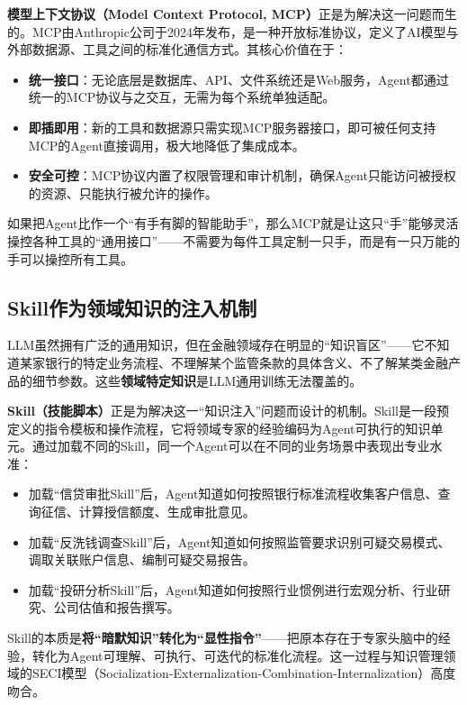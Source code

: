 \textbf{模型上下文协议（Model Context Protocol, MCP）}正是为解决这一问题而生的。MCP由Anthropic公司于2024年发布，是一种开放标准协议，定义了AI模型与外部数据源、工具之间的标准化通信方式。其核心价值在于：

\begin{itemize}[leftmargin=2em]
  \item \textbf{统一接口}：无论底层是数据库、API、文件系统还是Web服务，Agent都通过统一的MCP协议与之交互，无需为每个系统单独适配。
  \item \textbf{即插即用}：新的工具和数据源只需实现MCP服务器接口，即可被任何支持MCP的Agent直接调用，极大地降低了集成成本。
  \item \textbf{安全可控}：MCP协议内置了权限管理和审计机制，确保Agent只能访问被授权的资源、只能执行被允许的操作。
\end{itemize}

如果把Agent比作一个``有手有脚的智能助手''，那么MCP就是让这只``手''能够灵活操控各种工具的``通用接口''——不需要为每件工具定制一只手，而是有一只万能的手可以操控所有工具。

\subsection{Skill作为领域知识的注入机制}

LLM虽然拥有广泛的通用知识，但在金融领域存在明显的``知识盲区''——它不知道某家银行的特定业务流程、不理解某个监管条款的具体含义、不了解某类金融产品的细节参数。这些\textbf{领域特定知识}是LLM通用训练无法覆盖的。

\textbf{Skill（技能脚本）}正是为解决这一``知识注入''问题而设计的机制。Skill是一段预定义的指令模板和操作流程，它将领域专家的经验编码为Agent可执行的知识单元。通过加载不同的Skill，同一个Agent可以在不同的业务场景中表现出专业水准：

\begin{itemize}[leftmargin=2em]
  \item 加载``信贷审批Skill''后，Agent知道如何按照银行标准流程收集客户信息、查询征信、计算授信额度、生成审批意见。
  \item 加载``反洗钱调查Skill''后，Agent知道如何按照监管要求识别可疑交易模式、调取关联账户信息、编制可疑交易报告。
  \item 加载``投研分析Skill''后，Agent知道如何按照行业惯例进行宏观分析、行业研究、公司估值和报告撰写。
\end{itemize}

Skill的本质是\textbf{将``暗默知识''转化为``显性指令''}——把原本存在于专家头脑中的经验，转化为Agent可理解、可执行、可迭代的标准化流程。这一过程与知识管理领域的SECI模型（Socialization-Externalization-Combination-Internalization）高度吻合。

